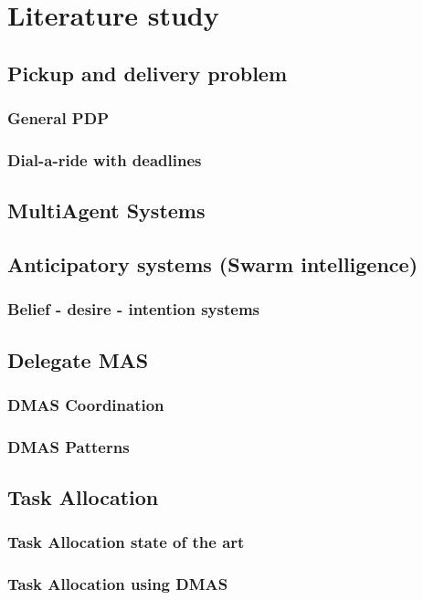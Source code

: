 \chapter{Literature study}

\section{Pickup and delivery problem}
\subsection{General PDP}
\subsection{Dial-a-ride with deadlines} \label{DAR-WD}

\section{MultiAgent Systems}

\section{Anticipatory systems (Swarm intelligence)}
\subsection{Belief - desire - intention systems}

\section{Delegate MAS}
\subsection{DMAS Coordination}
\subsection{DMAS Patterns}

\section{Task Allocation}
\subsection{Task Allocation state of the art}
\subsection{Task Allocation using DMAS}

